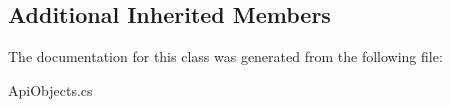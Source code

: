 \subsection*{Additional Inherited Members}


The documentation for this class was generated from the following file\+:\begin{DoxyCompactItemize}
\item 
Api\+Objects.\+cs\end{DoxyCompactItemize}
